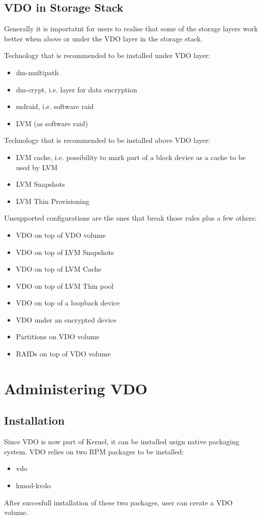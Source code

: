 \documentclass[
  color, %
  table, %
  lof,   %
  lot,   %
]{fithesis3}
\begin{document}
\subsection{VDO in Storage Stack}
\label{stack}
Generally it is importatnt for users to realise that some of the storage layers work better when above or under the VDO layer in the storage stack.

Technology that is recommended to be installed under VDO layer:

\begin{itemize}
  \item dm-multipath
  \item dm-crypt, i.e. layer for data encryption
  \item mdraid, i.e. software raid
  \item LVM (as software raid)
\end{itemize}

Technology that is recommended to be installed above VDO layer:

\begin{itemize}
  \item LVM cache, i.e. possibility to mark part of a block device as a cache to be used by LVM
  \item LVM Snapshots
  \item LVM Thin Provisioning
\end{itemize}

Unsupported configurations are the ones that break those rules plus a few others:

\begin{itemize}
  \item VDO on top of VDO volume
  \item VDO on top of LVM Snapshots
  \item VDO on top of LVM Cache
  \item VDO on top of LVM Thin pool
  \item VDO on top of a loopback device
  \item VDO under an encrypted device
  \item Partitions on VDO volume
  \item RAIDs on top of VDO volume          
\end{itemize}

\section{Administering VDO}
\subsection{Installation}
Since VDO is now part of Kernel, it can be installed usign native packaging system. VDO relies on two RPM packages to be installed:
\begin{itemize}
    \item vdo
    \item kmod-kvdo
\end{itemize}
After succesfull installation of these two packages, user can create a VDO volume.
\end{document}
